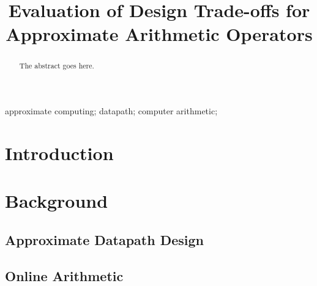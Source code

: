 \documentclass[10pt, conference, compsocconf]{IEEEtran}
\begin{document}
\title{Evaluation of Design Trade-offs for Approximate Arithmetic Operators}


\author{
}


\maketitle


\begin{abstract}
The abstract goes here. 

\end{abstract}

\begin{IEEEkeywords}
approximate computing; datapath; computer arithmetic;

\end{IEEEkeywords}


\section{Introduction}

\section{Background}
\subsection{Approximate Datapath Design}

\subsection{Online Arithmetic}
\end{document}
